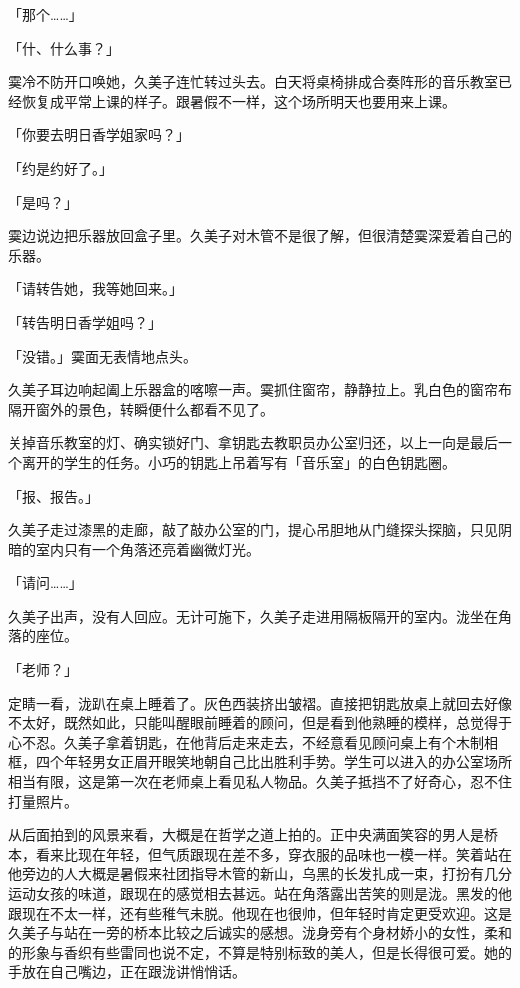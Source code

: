 \documentclass[UTF8]{ctexart}
\begin{document}
    「那个……」 

    「什、什么事？」 

    霙冷不防开口唤她，久美子连忙转过头去。白天将桌椅排成合奏阵形的音乐教室已经恢复成平常上课的样子。跟暑假不一样，这个场所明天也要用来上课。 

    「你要去明日香学姐家吗？」 

    「约是约好了。」 

    「是吗？」 

    霙边说边把乐器放回盒子里。久美子对木管不是很了解，但很清楚霙深爱着自己的乐器。 

    「请转告她，我等她回来。」 

    「转告明日香学姐吗？」 

    「没错。」霙面无表情地点头。 

    久美子耳边响起阖上乐器盒的喀嚓一声。霙抓住窗帘，静静拉上。乳白色的窗帘布隔开窗外的景色，转瞬便什么都看不见了。 

    关掉音乐教室的灯、确实锁好门、拿钥匙去教职员办公室归还，以上一向是最后一个离开的学生的任务。小巧的钥匙上吊着写有「音乐室」的白色钥匙圈。 

    「报、报告。」 

    久美子走过漆黑的走廊，敲了敲办公室的门，提心吊胆地从门缝探头探脑，只见阴暗的室内只有一个角落还亮着幽微灯光。 

    「请问……」 

    久美子出声，没有人回应。无计可施下，久美子走进用隔板隔开的室内。泷坐在角落的座位。 

    「老师？」 

    定睛一看，泷趴在桌上睡着了。灰色西装挤出皱褶。直接把钥匙放桌上就回去好像不太好，既然如此，只能叫醒眼前睡着的顾问，但是看到他熟睡的模样，总觉得于心不忍。久美子拿着钥匙，在他背后走来走去，不经意看见顾问桌上有个木制相框，四个年轻男女正眉开眼笑地朝自己比出胜利手势。学生可以进入的办公室场所相当有限，这是第一次在老师桌上看见私人物品。久美子抵挡不了好奇心，忍不住打量照片。 

    从后面拍到的风景来看，大概是在哲学之道上拍的。正中央满面笑容的男人是桥本，看来比现在年轻，但气质跟现在差不多，穿衣服的品味也一模一样。笑着站在他旁边的人大概是暑假来社团指导木管的新山，乌黑的长发扎成一束，打扮有几分运动女孩的味道，跟现在的感觉相去甚远。站在角落露出苦笑的则是泷。黑发的他跟现在不太一样，还有些稚气未脱。他现在也很帅，但年轻时肯定更受欢迎。这是久美子与站在一旁的桥本比较之后诚实的感想。泷身旁有个身材娇小的女性，柔和的形象与香织有些雷同也说不定，不算是特别标致的美人，但是长得很可爱。她的手放在自己嘴边，正在跟泷讲悄悄话。 
\end{document}
